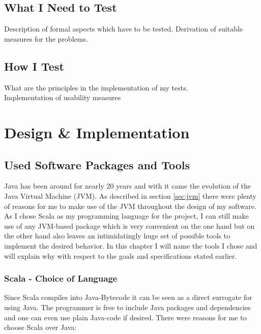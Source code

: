 \documentclass[11p]{scrartcl}
\begin{document}
\subsection{What I Need to Test}
Description of formal aspects which have to be tested. Derivation of suitable measures for the problems.
\subsection{How I Test}
What are the principles in the implementation of my tests.\\
Implementation of usability measures
 

\section{Design \& Implementation}
\label{sec:implementation}
\subsection{Used Software Packages and Tools}
\label{sec:softwarePackages}
Java has been around for nearly 20 years \cite{link:javaRelease1} and with it came the evolution of the Java Virtual Machine (JVM). As described in section \ref{sec:jvm} there were plenty of reasons for me to make use of the JVM throughout the design of my software.
As I chose Scala as my programming language for the project, I can still make use of any JVM-based package which is very convenient on the one hand but on the other hand also leaves an intimidatingly huge set of possible tools to implement the desired behavior. In this chapter I will name the tools I chose and will explain why with respect to the goals and specifications stated earlier.

\subsubsection{Scala - Choice of Language} %
Since Scala compiles into Java-Bytecode it can be seen as a direct surrogate for using Java. The programmer is free to include Java packages and dependencies and one can even use plain Java-code if desired. There were reasons for me to choose Scala over Java:\\
\end{document}
